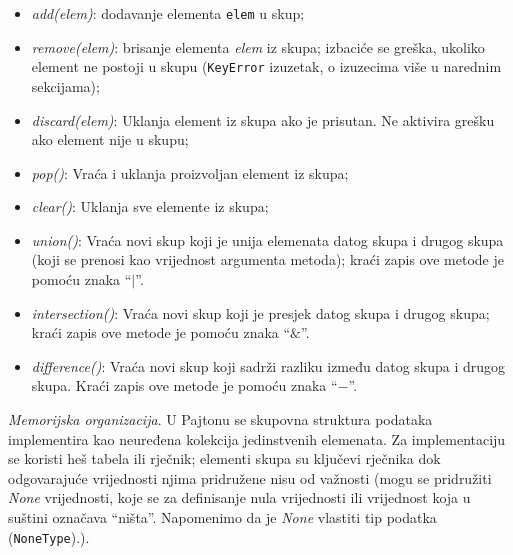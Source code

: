 \begin{itemize}
	\item \textit{add(elem)}: dodavanje elementa \texttt{elem} u skup; 
	\item \textit{remove(elem)}: brisanje elementa \textit{elem} iz skupa; izbaciće se greška, ukoliko element ne postoji u skupu (\texttt{KeyError} izuzetak, o izuzecima više u narednim sekcijama);
	\item \textit{discard(elem)}: Uklanja element iz skupa ako je prisutan. Ne aktivira grešku ako element nije u skupu;
	\item \textit{pop()}: Vraća i uklanja proizvoljan element iz skupa;
	\item \textit{clear()}: Uklanja sve elemente iz skupa;
	\item \textit{union()}: Vraća novi skup koji je unija elemenata datog skupa i drugog skupa (koji se prenosi kao vrijednost argumenta metoda); kraći zapis ove metode je pomoću znaka  ``$\mid$''.
    \item \textit{intersection()}: Vraća novi skup koji je presjek datog skupa i drugog skupa; kraći zapis ove metode je pomoću znaka ``$\&$''.
    \item \textit{difference()}: Vraća novi skup koji sadrži razliku između datog skupa i drugog skupa. Kraći zapis ove metode je pomoću znaka ``$-$''. 
\end{itemize}
 
 
 


\textit{Memorijska organizacija}. U Pajtonu se skupovna struktura podataka implementira kao neuređena kolekcija jedinstvenih elemenata. Za implementaciju se koristi heš tabela ili rječnik; elementi skupa su ključevi rječnika dok odgovarajuće vrijednosti njima pridružene nisu od važnosti (mogu se pridružiti \textit{None} vrijednosti, koje se za definisanje nula vrijednosti ili vrijednost koja u suštini  označava ``ništa''. Napomenimo da je \emph{None} vlastiti tip podatka (\texttt{NoneType}).).  

